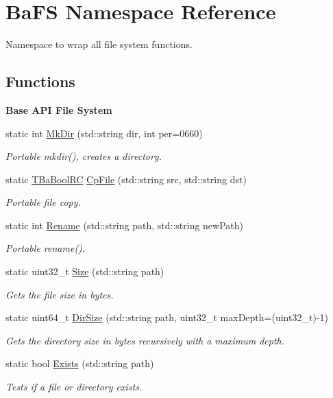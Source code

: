 \hypertarget{namespaceBaFS}{}\section{Ba\+F\+S Namespace Reference}
\label{namespaceBaFS}


Namespace to wrap all file system functions.  


\subsection*{Functions}
\begin{Indent}{\bf Base A\+P\+I File System}\par
\begin{DoxyCompactItemize}
\item 
static int \hyperlink{namespaceBaFS_a9e6346a9784d4de1dbda3c79ef8bb72b}{Mk\+Dir} (std\+::string dir, int per=0660)
\begin{DoxyCompactList}\small\item\em Portable mkdir(), creates a directory. \end{DoxyCompactList}\item 
static \hyperlink{BaBool_8h_a84d5a0de4729ca4c89f2479c605dbf3d}{T\+Ba\+Bool\+R\+C} \hyperlink{namespaceBaFS_a500756f66ff45aaf311421e7f68a0070}{Cp\+File} (std\+::string src, std\+::string dst)
\begin{DoxyCompactList}\small\item\em Portable file copy. \end{DoxyCompactList}\item 
static int \hyperlink{namespaceBaFS_ad729f83dfe589df3058696c6db6452c9}{Rename} (std\+::string path, std\+::string new\+Path)
\begin{DoxyCompactList}\small\item\em Portable rename(). \end{DoxyCompactList}\item 
static uint32\+\_\+t \hyperlink{namespaceBaFS_a526ea62172fcaa4003dd437863c6604c}{Size} (std\+::string path)
\begin{DoxyCompactList}\small\item\em Gets the file size in bytes. \end{DoxyCompactList}\item 
static uint64\+\_\+t \hyperlink{namespaceBaFS_aafa79b524a4f13b6531cf79b1f73774e}{Dir\+Size} (std\+::string path, uint32\+\_\+t max\+Depth=(uint32\+\_\+t)-\/1)
\begin{DoxyCompactList}\small\item\em Gets the directory size in bytes recursively with a maximum depth. \end{DoxyCompactList}\item 
static bool \hyperlink{namespaceBaFS_a73d165c90a00491cfe0b9ce3b5fe5c58}{Exists} (std\+::string path)
\begin{DoxyCompactList}\small\item\em Tests if a file or directory exists. \end{DoxyCompactList}\end{DoxyCompactItemize}
\end{Indent}


